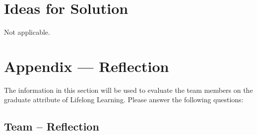 \documentclass[12pt]{article}
\begin{document}
\section{Ideas for Solution}
Not applicable.

\newpage{}
\section*{Appendix --- Reflection}

The information in this section will be used to evaluate the team members on the
graduate attribute of Lifelong Learning.  Please answer the following questions:

\subsection*{Team -- Reflection}
\end{document}
